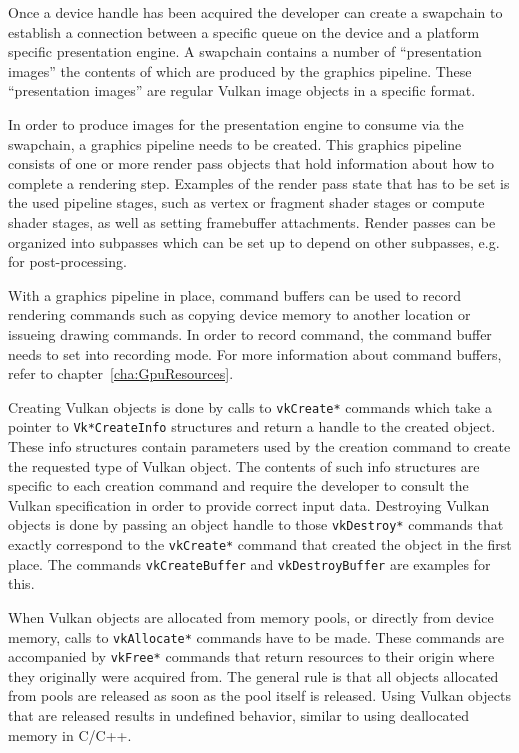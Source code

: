 
    Once a device handle has been acquired the developer can create a swapchain to establish a connection between a specific queue on the device and a platform specific presentation engine. A swapchain contains a number of ``presentation images'' the contents of which are produced by the graphics pipeline. These ``presentation images'' are regular Vulkan image objects in a specific format.

    In order to produce images for the presentation engine to consume via the swapchain, a graphics pipeline needs to be created. This graphics pipeline consists of one or more render pass objects that hold information about how to complete a rendering step. Examples of the render pass state that has to be set is the used pipeline stages, such as vertex or fragment shader stages or compute shader stages, as well as setting framebuffer attachments. Render passes can be organized into subpasses which can be set up to depend on other subpasses, e.g. for post-processing.

    With a graphics pipeline in place, command buffers can be used to record rendering commands such as copying device memory to another location or issueing drawing commands. In order to record command, the command buffer needs to set into recording mode. For more information about command buffers, refer to chapter~\ref{cha:GpuResources}.


    Creating Vulkan objects is done by calls to \lstinline{vkCreate*} commands which take a pointer to \lstinline{Vk*CreateInfo} structures and return a handle to the created object. These info structures contain parameters used by the creation command to create the requested type of Vulkan object. The contents of such info structures are specific to each creation command and require the developer to consult the Vulkan specification in order to provide correct input data. Destroying Vulkan objects is done by passing an object handle to those \lstinline{vkDestroy*} commands that exactly correspond to the \lstinline{vkCreate*} command that created the object in the first place. The commands \lstinline{vkCreateBuffer} and \lstinline{vkDestroyBuffer} are examples for this.

    When Vulkan objects are allocated from memory pools, or directly from device memory, calls to \lstinline{vkAllocate*} commands have to be made. These commands are accompanied by \lstinline{vkFree*} commands that return resources to their origin where they originally were acquired from. The general rule is that all objects allocated from pools are released as soon as the pool itself is released. Using Vulkan objects that are released results in undefined behavior, similar to using deallocated memory in C/C++.

